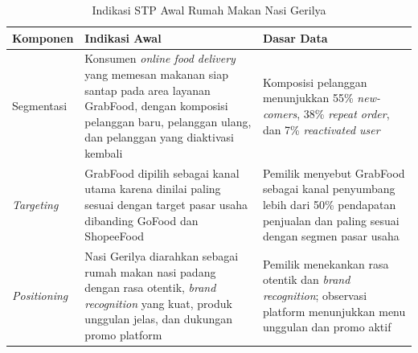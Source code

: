 \begin{table}[!htbp]
    \centering
    \caption{Indikasi STP Awal Rumah Makan Nasi Gerilya}
    \label{tab:stp_wawancara_awal}
    \begin{tabularx}{\textwidth}{|Z{2.8cm}|Y|Y|}
        \toprule
        \textbf{Komponen}    & \textbf{Indikasi Awal}                                                                                                                                                                      & \textbf{Dasar Data}                                                                                                          \\ \hline
        \midrule
        Segmentasi           & Konsumen \textit{online food delivery} yang memesan makanan siap santap pada area layanan GrabFood, dengan komposisi pelanggan baru, pelanggan ulang, dan pelanggan yang diaktivasi kembali & Komposisi pelanggan menunjukkan 55\% \textit{new-comers}, 38\% \textit{repeat order}, dan 7\% \textit{reactivated user}      \\ \hline
        \textit{Targeting}   & GrabFood dipilih sebagai kanal utama karena dinilai paling sesuai dengan target pasar usaha dibanding GoFood dan ShopeeFood                                                                 & Pemilik menyebut GrabFood sebagai kanal penyumbang lebih dari 50\% pendapatan penjualan dan paling sesuai dengan segmen pasar usaha \\ \hline
        \textit{Positioning} & Nasi Gerilya diarahkan sebagai rumah makan nasi padang dengan rasa otentik, \textit{brand recognition} yang kuat, produk unggulan jelas, dan dukungan promo platform                        & Pemilik menekankan rasa otentik dan \textit{brand recognition}; observasi platform menunjukkan menu unggulan dan promo aktif \\ \hline
        \bottomrule
    \end{tabularx}
\end{table}

